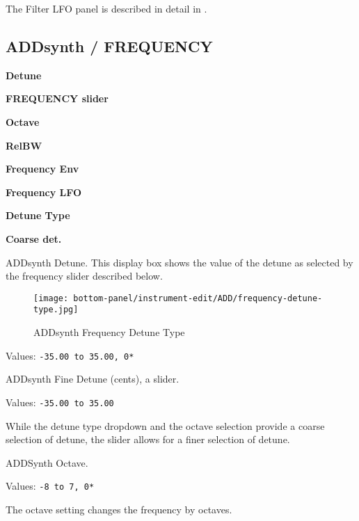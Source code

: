    The Filter LFO panel is described in detail in
   .

\subsection{ADDsynth / FREQUENCY}
\label{subsec:addsynth_frequency}

   \begin{enumber}
      \item \textbf{Detune}
      \item \textbf{FREQUENCY slider}
      \item \textbf{Octave}
      \item \textbf{RelBW}
      \item \textbf{Frequency Env}
      \item \textbf{Frequency LFO}
      \item \textbf{Detune Type}
      \item \textbf{Coarse det.}
   \end{enumber}

   \setcounter{ItemCounter}{0}      %

   ADDsynth Detune.
   This display box shows the value of the detune as selected by the
   frequency slider described below.

\begin{figure}[H]
   \centering 
   \texttt{[image: bottom-panel/instrument-edit/ADD/frequency-detune-type.jpg]}
   \caption{ADDsynth Frequency Detune Type}
   \label{fig:addsynth_freq_detune_type}
\end{figure}

   Values: \texttt{-35.00 to 35.00, 0*}

   ADDsynth Fine Detune (cents), a slider.

   Values: \texttt{-35.00 to 35.00}

   While the detune type dropdown and the octave selection provide a coarse
   selection of detune, the slider allows for a finer selection of detune.

   ADDSynth Octave.

   Values: \texttt{-8 to 7, 0*}

   The octave setting changes the frequency by octaves.

